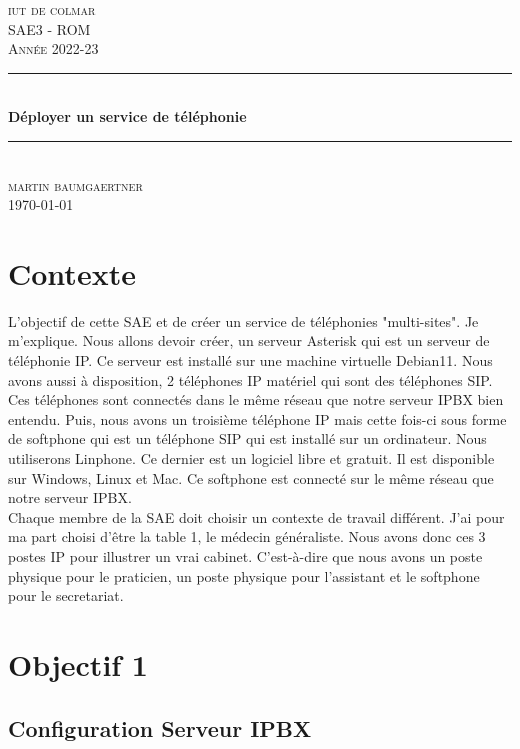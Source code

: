 \documentclass[12pt, a4paper]{article}
\begin{document}
\begin{titlepage}
	\newcommand{\HRule}{\rule{\linewidth}{0.5mm}} 
	\center 
	\textsc{\LARGE iut de colmar}\\[6.5cm] 
	\textsc{\Large SAE3 - ROM}\\[0.5cm] 
	\textsc{\large Année 2022-23}\\[0.5cm]
	\HRule\\[0.75cm]
	{\huge\bfseries Déployer un service de téléphonie}\\[0.4cm]
	\HRule\\[1.5cm]
	\textsc{\large martin baumgaertner}\\[6.5cm] 

	\vfill\vfill\vfill
	{\large\today} 
	\vfill
\end{titlepage}
\newpage
\tableofcontents
\newpage
\section*{Contexte}
L'objectif de cette SAE et de créer un service de téléphonies "multi-sites". Je
m'explique. Nous allons devoir créer, un serveur Asterisk qui est un serveur de
téléphonie IP. Ce serveur est installé sur une machine virtuelle Debian11. Nous
avons aussi à disposition, 2 téléphones IP matériel qui sont des téléphones SIP. Ces
téléphones sont connectés dans le même réseau que notre serveur IPBX bien entendu. 
Puis, nous avons un troisième téléphone IP mais cette fois-ci sous forme de softphone
qui est un téléphone SIP qui est installé sur un ordinateur. Nous utiliserons 
Linphone. Ce dernier est un logiciel libre et gratuit. Il est disponible sur
Windows, Linux et Mac. Ce softphone est connecté sur le même réseau que notre serveur
IPBX.\\

Chaque membre de la SAE doit choisir un contexte de travail différent. J'ai pour
ma part choisi d'être la table 1, le médecin généraliste. Nous 
avons donc ces 3 postes IP pour illustrer un vrai cabinet. C'est-à-dire que nous
avons un poste physique pour le praticien, un poste physique pour l'assistant et
le softphone pour le secretariat.\\

\section{Objectif 1}
\subsection{Configuration Serveur IPBX}
\end{document}
